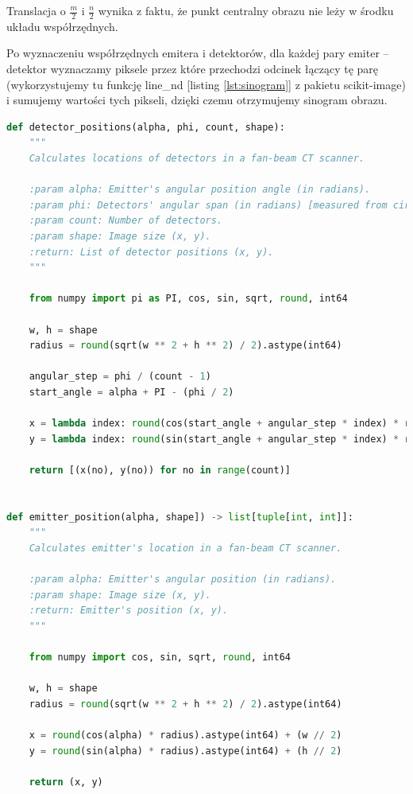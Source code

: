 \documentclass[a4paper, 11pt]{article}
\begin{document}
Translacja o $\frac{m}{2}$ i $\frac{n}{2}$ wynika z faktu, że punkt centralny obrazu nie leży w środku układu współrzędnych.


Po wyznaczeniu współrzędnych emitera i detektorów, dla każdej pary emiter -- detektor wyznaczamy piksele
przez które przechodzi odcinek łączący tę parę (wykorzystujemy tu funkcję line\_nd [listing \ref{lst:sinogram}] z pakietu scikit-image)
i sumujemy wartości tych pikseli, dzięki czemu otrzymujemy sinogram obrazu.

\begin{lstlisting}[language = Python, caption = Wyliczanie sinogramu, label = lst:sinogram]
	def detector_positions(alpha, phi, count, shape):
    """
    Calculates locations of detectors in a fan-beam CT scanner.

    :param alpha: Emitter's angular position angle (in radians).
    :param phi: Detectors' angular span (in radians) [measured from circle's center].
    :param count: Number of detectors.
    :param shape: Image size (x, y).
    :return: List of detector positions (x, y).    
    """

    from numpy import pi as PI, cos, sin, sqrt, round, int64

    w, h = shape
    radius = round(sqrt(w ** 2 + h ** 2) / 2).astype(int64)

    angular_step = phi / (count - 1)
    start_angle = alpha + PI - (phi / 2)

    x = lambda index: round(cos(start_angle + angular_step * index) * radius).astype(int64) + (w // 2)
    y = lambda index: round(sin(start_angle + angular_step * index) * radius).astype(int64) + (h // 2)

    return [(x(no), y(no)) for no in range(count)]


def emitter_position(alpha, shape]) -> list[tuple[int, int]]:
    """
    Calculates emitter's location in a fan-beam CT scanner.

    :param alpha: Emitter's angular position (in radians).
    :param shape: Image size (x, y).
    :return: Emitter's position (x, y).
    """

    from numpy import cos, sin, sqrt, round, int64

    w, h = shape
    radius = round(sqrt(w ** 2 + h ** 2) / 2).astype(int64)

    x = round(cos(alpha) * radius).astype(int64) + (w // 2)
    y = round(sin(alpha) * radius).astype(int64) + (h // 2)

    return (x, y)


\end{lstlisting}
\end{document}

